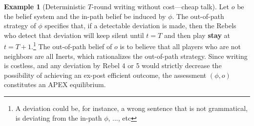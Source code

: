 \documentclass[12pt,letter]{article}
\newcommand\omicron{o}
\theoremstyle{definition}
\newtheorem{example}{Example}
\theoremstyle{remark}
\theoremstyle{claim}
\begin{document}
\begin{example}[Deterministic $T$-round writing without cost---cheap talk]
Let $\omicron$ be the belief system and the in-path belief be induced by $\phi$. The out-of-path strategy of $\phi$ specifies that, if a detectable deviation is made, then the Rebels who detect that deviation will keep silent until $t=T$ and then play \textbf{stay} at $t=T+1$.\footnote{A deviation could be, for instance, a wrong sentence that is not grammatical, is deviating from the in-path $\phi$, ..., etc} 
The out-of-path belief of $\omicron$ is to believe that all players who are not neighbors are all Inerts, which rationalizes the out-of-path strategy. Since writing is costless, and any deviation by Rebel 4 or 5 would strictly decrease the possibility of achieving an ex-post efficient outcome, the assessment $(\phi,\omicron)$ constitutes an APEX equilibrium.

\end{example}


%
\end{document}

